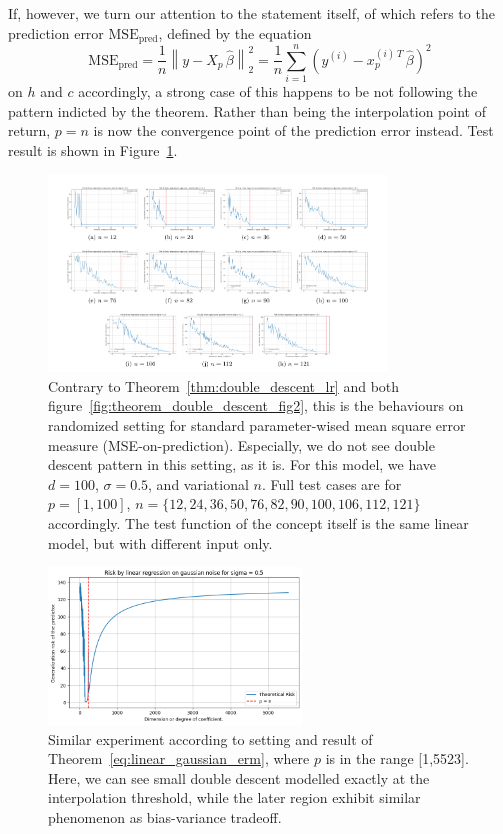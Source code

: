 \documentclass[10pt]{article} %
\begin{document}
If, however, we turn our attention to the statement itself, of which refers to the prediction error $\mathrm{MSE}_{\mathrm{pred}}$, defined by the equation
\begin{equation}
\mathrm{MSE}_{\mathrm{pred}}
=
\frac{1}{n}
\left\lVert
  y - X_{p}\,\hat\beta
\right\rVert_{2}^{2}
=
\frac{1}{n}
\sum_{i=1}^{n}
\left(
  y^{(i)} - x_{p}^{(i)\,T}\,\hat\beta
\right)^{2}
\end{equation}
on $h$ and $c$ accordingly, a strong case of this happens to be not following the pattern indicted by the theorem. Rather than being the interpolation point of return, $p=n$ is now the convergence point of the prediction error instead. Test result is shown in Figure~\ref{fig:theorem_double_descent_fig3}.

\begin{figure}[htb]
    \centering
    \includegraphics[width=0.8\textwidth]{pdf/theorem_3.pdf}
    \caption{Contrary to Theorem~\ref{thm:double_descent_lr} and both figure~\ref{fig:theorem_double_descent_fig2}, this is the behaviours on randomized setting for standard parameter-wised mean square error measure (MSE-on-prediction). Especially, we do not see double descent pattern in this setting, as it is. For this model, we have $d=100$, $\sigma = 0.5$, and variational $n$. Full test cases are for $p=[1,100]$, $n=\{12,24,36,50,76,82,90,100,106,112,121\}$ accordingly. The test function of the concept itself is the same linear model, but with different input only.}
    \label{fig:theorem_double_descent_fig3}
\end{figure}
\begin{figure}[htb]
  \centering
  \includegraphics[width=0.6\textwidth]{media/dimensional_descent.png}
  \caption{Similar experiment according to setting and result of Theorem~\ref{eq:linear_gaussian_erm}, where $p$ is in the range [1,5523]. Here, we can see small double descent modelled exactly at the interpolation threshold, while the later region exhibit similar phenomenon as bias-variance tradeoff.}
  \label{fig:contrarian}
\end{figure}
\end{document}
